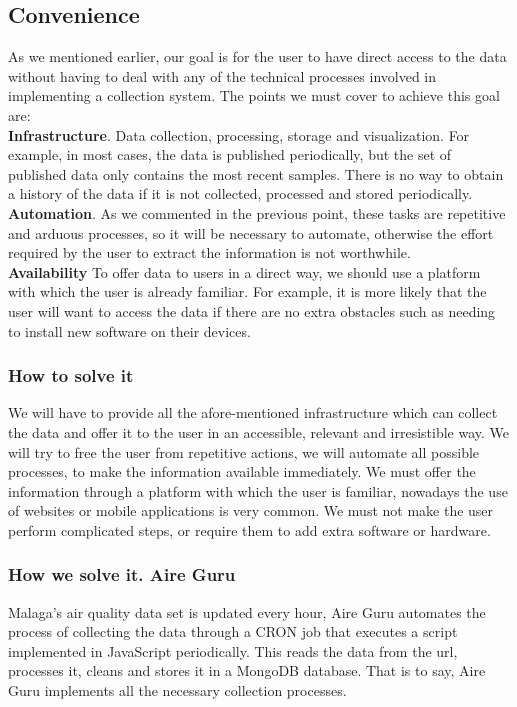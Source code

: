 \subsection{Convenience}
As we mentioned earlier, our goal is for the user to have direct access to the data without having to deal with any
of the technical processes involved in implementing a collection system. The points we must cover to achieve this goal are: \\

\textbf{Infrastructure}. Data collection, processing, storage and visualization. For example, in most cases, the data is
published periodically, but the set of published data only contains the most recent samples. There is no way to obtain
a history of the data if it is not collected, processed and stored periodically. \\

\textbf{Automation}. As we commented in the previous point, these tasks are repetitive and arduous processes, so it will be
necessary to automate, otherwise the effort required by the user to extract the information is not worthwhile. \\

\textbf{Availability} To offer data to users in a direct way, we should use a platform with which the user is already familiar. For example, it is more likely that the user will want to access the data if there are no extra obstacles such as needing to install new software on their devices. \\

\subsubsection{How to solve it} 
We will have to provide all the afore-mentioned infrastructure which can collect the data and offer it to the user in an accessible, relevant and irresistible way.
We will try to free the user from repetitive actions, we will automate all possible processes, to make the information available immediately.
We must offer the information through a platform with which the user is familiar, nowadays the use of websites or mobile applications is very common.
We must not make the user perform complicated steps, or require them to add extra software or hardware.

\subsubsection{How we solve it. Aire Guru} 
Malaga's air quality data set is updated every hour, Aire Guru automates the process of collecting the
data through a CRON job that executes a script implemented in JavaScript periodically. This reads the data from the url, processes it,
cleans and stores it in a MongoDB database. That is to say, Aire Guru implements all the necessary collection processes.

